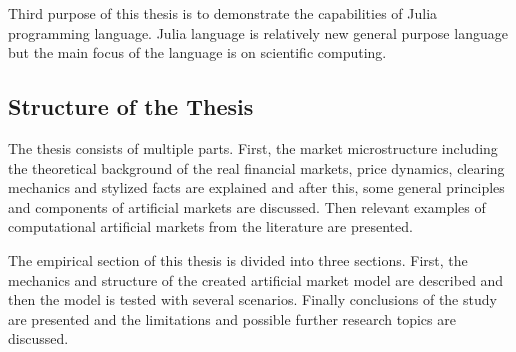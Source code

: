 Third purpose of this thesis is to demonstrate the capabilities of Julia programming language.
Julia language is relatively new general purpose language but the main focus of the language is 
on scientific computing.


\subsection{Structure of the Thesis}
The thesis consists of multiple parts. First, the market microstructure including the theoretical 
background of the real financial markets, price dynamics, clearing mechanics and stylized facts 
are explained and after this, some general principles and components of artificial markets are 
discussed. Then relevant examples of computational artificial markets from the literature
are presented. 

The empirical section of this thesis is divided into three sections. First, the mechanics and
structure of the created artificial market model are described and then the model is tested
with several scenarios. Finally conclusions of the study are presented and the limitations and
possible further research topics are discussed.